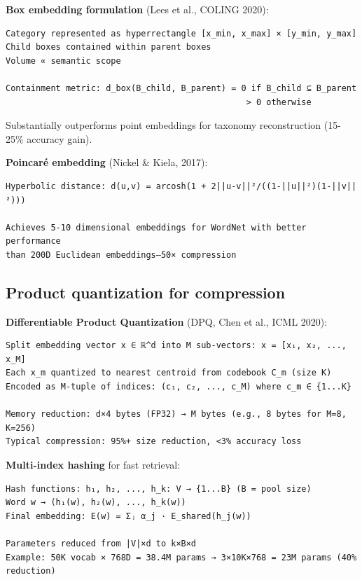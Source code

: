 \documentclass[11pt]{article}
\begin{document}
\textbf{Box embedding formulation} (Lees et al., COLING 2020):

\begin{verbatim}
Category represented as hyperrectangle [x_min, x_max] × [y_min, y_max]
Child boxes contained within parent boxes
Volume ∝ semantic scope

Containment metric: d_box(B_child, B_parent) = 0 if B_child ⊆ B_parent
                                                > 0 otherwise
\end{verbatim}

Substantially outperforms point embeddings for taxonomy reconstruction (15-25\% accuracy gain).

\textbf{Poincaré embedding} (Nickel \& Kiela, 2017):

\begin{verbatim}
Hyperbolic distance: d(u,v) = arcosh(1 + 2||u-v||²/((1-||u||²)(1-||v||²)))

Achieves 5-10 dimensional embeddings for WordNet with better performance
than 200D Euclidean embeddings—50× compression
\end{verbatim}

\subsection{Product quantization for compression}

\textbf{Differentiable Product Quantization} (DPQ, Chen et al., ICML 2020):

\begin{verbatim}
Split embedding vector x ∈ ℝ^d into M sub-vectors: x = [x₁, x₂, ..., x_M]
Each x_m quantized to nearest centroid from codebook C_m (size K)
Encoded as M-tuple of indices: (c₁, c₂, ..., c_M) where c_m ∈ {1...K}

Memory reduction: d×4 bytes (FP32) → M bytes (e.g., 8 bytes for M=8, K=256)
Typical compression: 95%+ size reduction, <3% accuracy loss
\end{verbatim}

\textbf{Multi-index hashing} for fast retrieval:

\begin{verbatim}
Hash functions: h₁, h₂, ..., h_k: V → {1...B} (B = pool size)
Word w → (h₁(w), h₂(w), ..., h_k(w))
Final embedding: E(w) = Σⱼ α_j · E_shared(h_j(w))

Parameters reduced from |V|×d to k×B×d
Example: 50K vocab × 768D = 38.4M params → 3×10K×768 = 23M params (40% reduction)
\end{verbatim}
\end{document}

